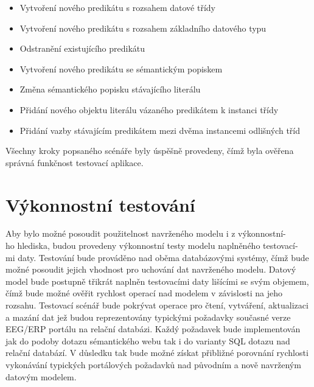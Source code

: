 \documentclass{projekt}
\begin{document}
\begin{itemize}
\vspace{0.45cm}
\item Vytvoření nového predikátu s rozsahem datové třídy
\item Vytvoření nového predikátu s rozsahem základního datového typu
\item Odstranění existujícího predikátu
\item Vytvoření nového predikátu se sémantickým popiskem
\item Změna sémantického popisku stávajícího literálu
\item Přidání nového objektu literálu vázaného predikátem k instanci třídy
\item Přidání vazby stávajícím predikátem mezi dvěma instancemi odlišných tříd
\end{itemize}


Všechny kroky popsaného scénáře byly úspěšně provedeny, čímž byla ověřena správná funkčnost testovací aplikace.

\section{Výkonnostní testování}
\hspace{0.65cm}Aby bylo možné posoudit použitelnost navrženého modelu i z výkonnostní-\\ho hlediska, budou provedeny výkonnostní testy modelu naplněného testovací-\\mi daty. Testování bude prováděno nad oběma databázovými systémy, čímž bude možné posoudit jejich vhodnost pro uchování dat navrženého modelu. Datový model bude postupně třikrát naplněn testovacími daty lišícími se svým objemem, čímž bude možné ověřit rychlost operací nad modelem v závislosti na jeho rozsahu. Testovací scénář bude pokrývat operace pro čtení, vytváření, aktualizaci a mazání dat jež budou reprezentovány typickými požadavky současné verze EEG/ERP portálu na relační databázi. Každý požadavek bude implementován jak do podoby dotazu sémantického webu tak i do varianty SQL dotazu nad relační databází. V důsledku tak bude možné získat přibližné porovnání rychlosti vykonávání typických portálových požadavků nad původním a nově navrženým datovým modelem.
\end{document}
